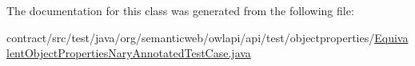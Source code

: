 The documentation for this class was generated from the following file\-:\begin{DoxyCompactItemize}
\item 
contract/src/test/java/org/semanticweb/owlapi/api/test/objectproperties/\hyperlink{_equivalent_object_properties_nary_annotated_test_case_8java}{Equivalent\-Object\-Properties\-Nary\-Annotated\-Test\-Case.\-java}\end{DoxyCompactItemize}
